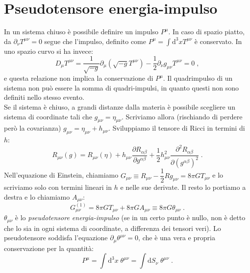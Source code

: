\documentclass[12pt,a4paper]{report}
\theoremstyle{definition}
\newcommand{\diff}[1][]{\mathrm{d}#1}
\begin{document}
\section{Pseudotensore energia-impulso}
In un sistema chiuso è possibile definire un impulso $P^{\mu}$. In caso di spazio piatto, da $\partial_{\nu}T^{\mu\nu}=0$ segue che l'impulso, definito come $P^{\mu}=\int \diff^3{x}T^{\mu\nu}$ è conservato. In uno spazio curvo si ha invece:
$$
D_{\mu}T^{\mu\nu}=\frac{1}{\sqrt{-g}}\partial_{\mu}(\sqrt{-g}T^{\mu\nu})-\frac{1}{2}\partial_{\nu}g_{\mu\nu}T^{\mu\nu}=0\;,
$$
e questa relazione non implica la conservazione di $P^{\mu}$. Il quadrimpulso di un sistema non può essere la somma di quadri-impulsi, in quanto questi non sono definiti nello stesso evento. \\
Se il sistema è chiuso, a grandi distanze dalla materia è possibile scegliere un sistema di coordinate tali che $g_{\mu\nu}=\eta_{\mu\nu}$. Scriviamo allora (rischiando di perdere però la covarianza) $g_{\mu\nu}=\eta_{\mu\nu}+h_{\mu\nu}$. Sviluppiamo il tensore di Ricci in termini di $h$:
\begin{equation}
R_{\mu\nu}(g)=R_{\mu\nu}(\eta)+h_{\mu\nu}\frac{\partial R_{\alpha\beta}}{\partial g^{\alpha\beta}}+\frac{1}{2}h^2_{\mu\nu}\frac{\partial^2R_{\alpha\beta}}{\partial (g^{\alpha\beta})^2}\;.
\end{equation}
Nell'equazione di Einstein, chiamiamo $G_{\mu\nu}\equiv R_{\mu\nu}-\dfrac{1}{2}Rg_{\mu\nu}=8\pi GT_{\mu\nu}$ e lo scriviamo solo con termini lineari in $h$ e nelle sue derivate. Il resto lo portiamo a destra e lo chiamiamo $A_{\mu\nu}$:
\begin{equation}
G^{(1)}_{\mu\nu}=8\pi GT_{\mu\nu}+8\pi GA_{\mu\nu}\equiv 8\pi G\theta_{\mu\nu}\;.
\end{equation}
$\theta_{\mu\nu}$ è lo \emph{pseudotensore energia-impulso} (se in un certo punto è nullo, non è detto che lo sia in ogni sistema di coordinate, a differenza dei tensori veri). Lo pseudotensore soddisfa l'equazione $\partial_{\mu}\theta^{\mu\nu}=0$, che è una vera e propria conservazione per la quantità:
\begin{equation}
P^{\mu}=\int\diff^3{x}\;\theta^{\mu\nu}=\int\diff{S_{\nu}}\;\theta^{\mu\nu}\;.
\end{equation}
\end{document}
